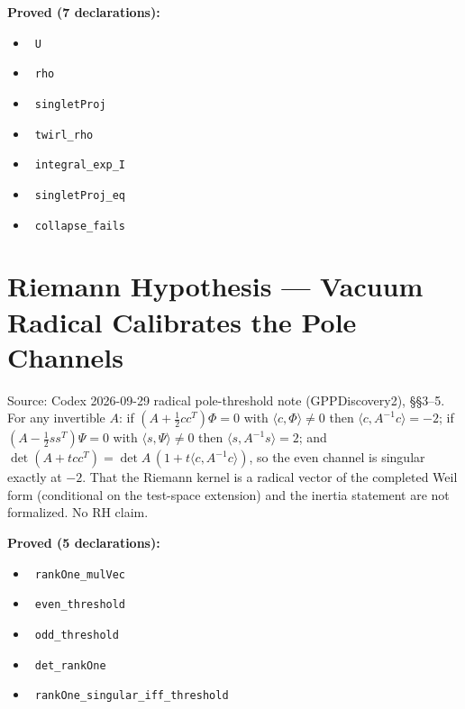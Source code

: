 \documentclass{report}
\theoremstyle{definition}
\begin{document}
\noindent\textbf{Proved (7 declarations):}
\begin{itemize}
  \item {}\leanok\ \texttt{U}
  \item {}\leanok\ \texttt{rho}
  \item {}\leanok\ \texttt{singletProj}
  \item {}\leanok\ \texttt{twirl\_rho}
  \item {}\leanok\ \texttt{integral\_exp\_I}
  \item {}\leanok\ \texttt{singletProj\_eq}
  \item {}\leanok\ \texttt{collapse\_fails}
\end{itemize}

\section{Riemann Hypothesis --- Vacuum Radical Calibrates the Pole Channels}
Source: Codex 2026-09-29 radical pole-threshold note (GPPDiscovery2), \S\S3--5. For any invertible $A$: if $(A+\tfrac12cc^T)\Phi=0$ with $\langle c,\Phi\rangle\ne0$ then $\langle c,A^{-1}c\rangle=-2$; if $(A-\tfrac12ss^T)\Psi=0$ with $\langle s,\Psi\rangle\ne0$ then $\langle s,A^{-1}s\rangle=2$; and $\det(A+tcc^T)=\det A\,(1+t\langle c,A^{-1}c\rangle)$, so the even channel is singular exactly at $-2$. That the Riemann kernel is a radical vector of the completed Weil form (conditional on the test-space extension) and the inertia statement are not formalized. No RH claim.

\noindent\textbf{Proved (5 declarations):}
\begin{itemize}
  \item {}\leanok\ \texttt{rankOne\_mulVec}
  \item {}\leanok\ \texttt{even\_threshold}
  \item {}\leanok\ \texttt{odd\_threshold}
  \item {}\leanok\ \texttt{det\_rankOne}
  \item {}\leanok\ \texttt{rankOne\_singular\_iff\_threshold}
\end{itemize}
\end{document}
